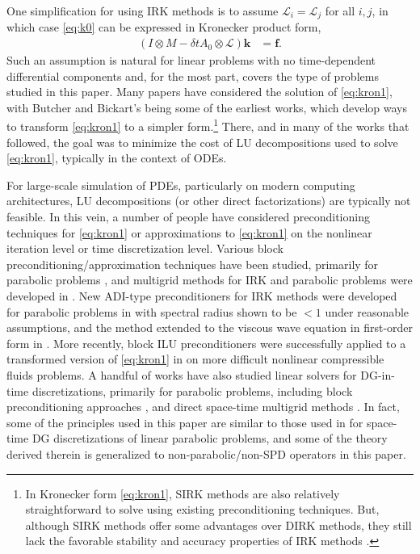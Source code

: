 \documentclass[a4paper,10pt]{article}
\begin{document}
One simplification for using IRK methods is to assume $\mathcal{L}_i =
\mathcal{L}_j$ for all $i,j$, in which case \eqref{eq:k0} can be expressed in
Kronecker product form,
%
\begin{align}\label{eq:kron1}
(I\otimes M - \delta t A_0\otimes \mathcal{L})\mathbf{k} & = \mathbf{f}.
\end{align}
%
Such an assumption is natural for linear problems with no time-dependent differential
components and, for the most part, covers the type of problems studied in this paper.
Many papers have considered the solution of \eqref{eq:kron1}, with Butcher
\cite{butcher76} and Bickart's \cite{bickart77} being some of the earliest works,
which develop ways to transform \eqref{eq:kron1} to a simpler form.\footnote{In Kronecker form \eqref{eq:kron1}, SIRK methods \cite{norsett1976runge} are also
relatively straightforward to solve using existing preconditioning techniques.
But, although SIRK methods offer some advantages over DIRK methods, they still lack
the favorable stability and accuracy properties of IRK methods \cite{burrage82,orel91}.}
There, and in many of the works that followed, the goal was to minimize the cost of LU
decompositions used to solve \eqref{eq:kron1}, typically in the context of ODEs.

For large-scale simulation of PDEs, particularly on modern computing architectures,
LU decompositions (or other direct factorizations) are typically not feasible. In this
vein, a number of people have considered preconditioning techniques for \eqref{eq:kron1}
or approximations to \eqref{eq:kron1} on the nonlinear iteration level or time
discretization level. Various block preconditioning/approximation techniques
have been studied, primarily for parabolic problems
\cite{houwen97b,Houwen97c,nissen11,mardel07,staff06,hoffmann97,jay00}, and
multigrid methods for IRK and parabolic problems were developed in \cite{vanlent05}.
New ADI-type preconditioners for IRK methods were developed for parabolic problems
in \cite{chen14} with spectral radius shown to be $<1$ under reasonable assumptions,
and the method extended to the viscous wave equation in first-order form in
\cite{chen16}. More recently, block ILU preconditioners were successfully applied
to a transformed version of \eqref{eq:kron1} in \cite{pazner17} on more difficult
nonlinear compressible fluids problems.
A handful of works have also studied linear solvers for DG-in-time discretizations,
primarily for parabolic problems, including block preconditioning approaches
\cite{exh,8jp,27n}, and direct space-time multigrid methods
\cite{gander2016analysis}. In fact, some of the principles used in this paper
are similar to those used in \cite{exh} for space-time DG discretizations of
linear parabolic problems, and some of the theory derived therein is generalized
to non-parabolic/non-SPD operators in this paper.
\end{document}
